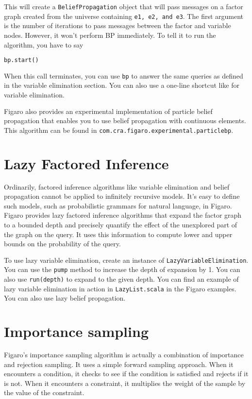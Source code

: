 This will create a \texttt{BeliefPropagation} object that will pass messages on a factor graph created from the universe containing \texttt{e1, e2, and e3}. The first argument is the number of iterations to pass messages between the factor and variable nodes. However, it won't perform BP immediately. To tell it to run the algorithm, you have to say

\begin{flushleft}
\texttt{bp.start()}
\end{flushleft}

When this call terminates, you can use \texttt{bp} to answer the same queries as defined in the variable elimination section. You can also use a one-line shortcut like for variable elimination.

Figaro also provides an experimental implementation of particle belief propagation that enables you to use belief propagation with continuous elements. This algorithm can be found in \texttt{com.cra.figaro.experimental.particlebp}.

\section{Lazy Factored Inference}

Ordinarily, factored inference algorithms like variable elimination and belief propagation cannot be applied to infinitely recursive models. It's easy to define such models, such as probabilistic grammars for natural language, in Figaro. Figaro provides lazy factored inference algorithms that expand the factor graph to a bounded depth and precisely quantify the effect of the unexplored part of the graph on the query. It uses this information to compute lower and upper bounds on the probability of the query. 

To use lazy variable elimination, create an instance of \texttt{LazyVariableElimination}. You can use the \texttt{pump} method to increase the depth of expansion by 1. You can also use \texttt{run(depth)} to expand to the given depth. You can find an example of lazy variable elimination in action in \texttt{LazyList.scala} in the Figaro examples. You can also use lazy belief propagation.

\section{Importance sampling}

Figaro's importance sampling algorithm is actually a combination of importance and rejection sampling. It uses a simple forward sampling approach. When it encounters a condition, it checks to see if the condition is satisfied and rejects if it is not. When it encounters a constraint, it multiplies the weight of the sample by the value of the constraint.

